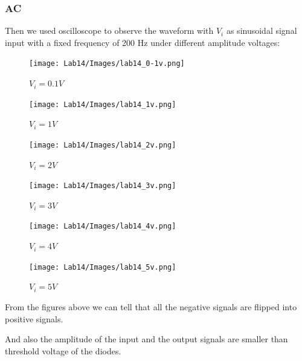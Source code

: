     \subsubsection{AC}
    Then we used oscilloscope to observe the waveform with $V_i$ as sinusoidal signal input with a fixed frequency of 200 Hz under different amplitude voltages:\par
        \begin{figure}[h]
            \centering
            \texttt{[image: Lab14/Images/lab14\_0-1v.png]}
            \caption{$V_i=0.1V$}
            \label{l14vi01v}
        \end{figure}
        \FloatBarrier
        \begin{figure}[h]
            \centering
            \texttt{[image: Lab14/Images/lab14\_1v.png]}
            \caption{$V_i=1V$}
            \label{l14vi1v}
        \end{figure}
        \FloatBarrier
        \begin{figure}[h]
            \centering
            \texttt{[image: Lab14/Images/lab14\_2v.png]}
            \caption{$V_i=2V$}
            \label{l14vi2v}
        \end{figure}
        \FloatBarrier
        \begin{figure}[h]
            \centering
            \texttt{[image: Lab14/Images/lab14\_3v.png]}
            \caption{$V_i=3V$}
            \label{l14vi3v}
        \end{figure}
        \FloatBarrier
        \begin{figure}[h]
            \centering
            \texttt{[image: Lab14/Images/lab14\_4v.png]}
            \caption{$V_i=4V$}
            \label{l14vi4v}
        \end{figure}
        \FloatBarrier
        \begin{figure}[h]
            \centering
            \texttt{[image: Lab14/Images/lab14\_5v.png]}
            \caption{$V_i=5V$}
            \label{l14vi5v}
        \end{figure}
        \FloatBarrier
    From the figures above we can tell that all the negative signals are flipped into positive signals.\par
    And also the amplitude of the input and the output signals are smaller than threshold voltage of the diodes.\par
